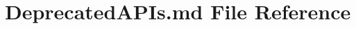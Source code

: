 \hypertarget{_deprecated_a_p_is_8md}{}\section{Deprecated\+A\+P\+Is.\+md File Reference}
\label{_deprecated_a_p_is_8md}
